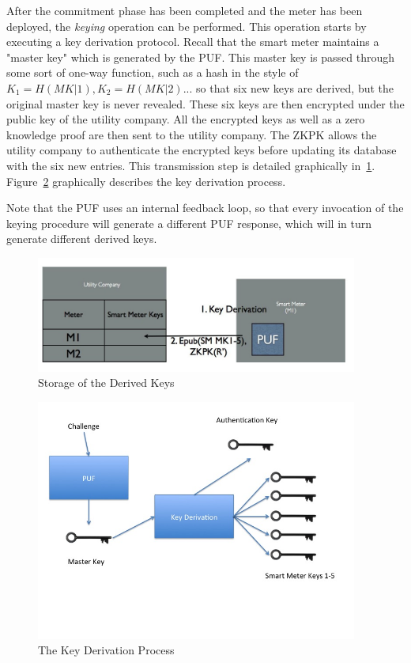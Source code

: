 After the commitment phase has been completed and the meter has been deployed, the \textit{keying} operation
can be performed. This operation starts by executing a key derivation protocol. Recall that the smart meter 
maintains a "master key" which is generated by the PUF. 
This master key is passed through some sort of one-way function, such as a hash
in the style of $K_1=H(MK|1), K_2=H(MK|2)...$ so that six new keys are derived, but the original master key is
never revealed. These six keys are then
encrypted under the public key of the utility company. All the encrypted keys as well as a zero knowledge proof
are then sent to the utility company. The ZKPK allows the utility company to authenticate the encrypted keys before
updating its database with the six new entries. This transmission step is detailed graphically in~\ref{fig:doeusage}.
Figure~\ref{fig:keyderivation} graphically describes the key derivation process.

Note that the PUF uses an internal feedback loop, so that every invocation of the keying procedure will generate a
different PUF response, which will in turn generate different derived keys.

\begin{figure}[!ht]
\centering
\includegraphics[width=400px]{images/doe_key_config.jpg}
\caption{Storage of the Derived Keys}
\label{fig:doeusage}
\end{figure}
\FloatBarrier

\begin{figure}[!ht]
\centering
\includegraphics[width=400px]{images/keyderivation.jpg}
\caption{The Key Derivation Process}
\label{fig:keyderivation}
\end{figure}
\FloatBarrier


